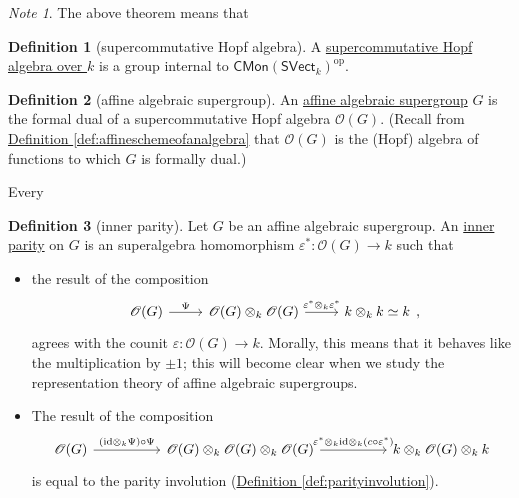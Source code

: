 \documentclass[a4paper,10pt]{scrreprt}
\newcommand{\defn}[1]{\ul{#1}}
\theoremstyle{definition}
\newtheorem{definition}{Definition}[section]
\theoremstyle{plain}
\theoremstyle{remark}
\newtheorem{note}{Note}[section]
\begin{document}
\begin{note}
  The above theorem means that 
\end{note}

\begin{definition}[supercommutative Hopf algebra]
  \label{def:supercommutativehopfalgebra}
  A \defn{supercommutative Hopf algebra over $k$} is a group internal to $\mathsf{CMon}(\mathsf{SVect}_{k})^{\mathrm{op}}$.
\end{definition}

\begin{definition}[affine algebraic supergroup]
  \label{def:affinealgebraicsupergroup}
  An \defn{affine algebraic supergroup} $G$ is the formal dual of a supercommutative Hopf algebra $\mathscr{O}(G)$. (Recall from \hyperref[def:affineschemeofanalgebra]{Definition \ref*{def:affineschemeofanalgebra}} that $\mathscr{O}(G)$ is the (Hopf) algebra of functions to which $G$ is formally dual.)
\end{definition}

Every 

\begin{definition}[inner parity]
  \label{def:innerparity}
  Let $G$ be an affine algebraic supergroup. An \defn{inner parity} on $G$ is an superalgebra homomorphism $\varepsilon^{*}\colon \mathscr{O}(G) \to k$ such that
  \begin{itemize}
    \item the result of the composition
      \begin{equation*}
        \begin{tikzcd}
          \mathscr{O}(G) 
          \arrow[r, "\Psi"]
          & \mathscr{O}(G) \otimes_{k} \mathscr{O}(G)
          \arrow[r, "\varepsilon^{*} \otimes_{k} \varepsilon^{*}"]
          & k \otimes_{k} k \simeq k
        \end{tikzcd},
      \end{equation*}
      agrees with the counit $\varepsilon\colon \mathscr{O}(G) \to k$.
      Morally, this means that it behaves like the multiplication by $\pm 1$; this will become clear when we study the representation theory of affine algebraic supergroups.

    \item The result of the composition
      \begin{equation*}
        \begin{tikzcd}[column sep=huge]
          \mathscr{O}(G) 
          \arrow[r, "(\mathrm{id} \otimes_{k} \Psi) \circ \Psi"]
          & \mathscr{O}(G) \otimes_{k} \mathscr{O}(G) \otimes_{k} \mathscr{O}(G)
          \arrow[r, "\varepsilon^{*} \otimes_{k} \mathrm{id} \otimes_{k} (c \circ \varepsilon^{*})"]
          & k \otimes_{k} \mathscr{O}(G) \otimes_{k} k
        \end{tikzcd}
      \end{equation*}
      is equal to the parity involution (\hyperref[def:parityinvolution]{Definition \ref*{def:parityinvolution}}).
  \end{itemize}
\end{definition}
\end{document}
